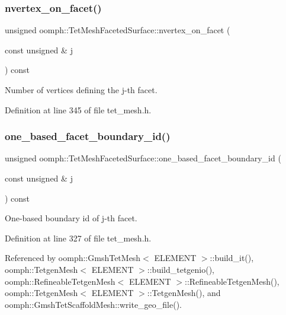\subsubsection{\texorpdfstring{nvertex\+\_\+on\+\_\+facet()}{nvertex\_on\_facet()}}
{\footnotesize\ttfamily unsigned oomph\+::\+Tet\+Mesh\+Faceted\+Surface\+::nvertex\+\_\+on\+\_\+facet (\begin{DoxyParamCaption}\item[{const unsigned \&}]{j }\end{DoxyParamCaption}) const\hspace{0.3cm}{\ttfamily [inline]}}



Number of vertices defining the j-\/th facet. 



Definition at line 345 of file tet\+\_\+mesh.\+h.

\mbox{\label{classoomph_1_1TetMeshFacetedSurface_a86b099447be23301fdfd4abdeee75560}} 
\subsubsection{\texorpdfstring{one\+\_\+based\+\_\+facet\+\_\+boundary\+\_\+id()}{one\_based\_facet\_boundary\_id()}}
{\footnotesize\ttfamily unsigned oomph\+::\+Tet\+Mesh\+Faceted\+Surface\+::one\+\_\+based\+\_\+facet\+\_\+boundary\+\_\+id (\begin{DoxyParamCaption}\item[{const unsigned \&}]{j }\end{DoxyParamCaption}) const\hspace{0.3cm}{\ttfamily [inline]}}



One-\/based boundary id of j-\/th facet. 



Definition at line 327 of file tet\+\_\+mesh.\+h.



Referenced by oomph\+::\+Gmsh\+Tet\+Mesh$<$ E\+L\+E\+M\+E\+N\+T $>$\+::build\+\_\+it(), oomph\+::\+Tetgen\+Mesh$<$ E\+L\+E\+M\+E\+N\+T $>$\+::build\+\_\+tetgenio(), oomph\+::\+Refineable\+Tetgen\+Mesh$<$ E\+L\+E\+M\+E\+N\+T $>$\+::\+Refineable\+Tetgen\+Mesh(), oomph\+::\+Tetgen\+Mesh$<$ E\+L\+E\+M\+E\+N\+T $>$\+::\+Tetgen\+Mesh(), and oomph\+::\+Gmsh\+Tet\+Scaffold\+Mesh\+::write\+\_\+geo\+\_\+file().

